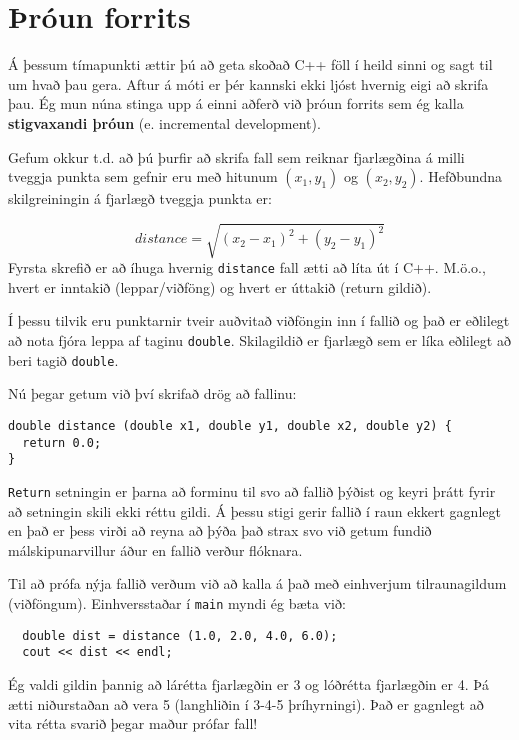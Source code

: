 \section{Þróun forrits}
\label{distance}

Á þessum tímapunkti ættir þú að geta skoðað C++ föll í heild sinni og sagt til um hvað þau gera.
Aftur á móti er þér kannski ekki ljóst hvernig eigi að skrifa þau.
Ég mun núna stinga upp á einni aðferð við þróun forrits sem ég kalla {\bf stigvaxandi þróun} (e. incremental development).


Gefum okkur t.d. að þú þurfir að skrifa fall sem reiknar fjarlægðina á milli tveggja punkta sem gefnir eru með hitunum $(x_1, y_1)$ og $(x_2, y_2)$.
Hefðbundna skilgreiningin á fjarlægð tveggja punkta er:

\begin{equation}
distance = \sqrt{(x_2 - x_1)^2 + (y_2 - y_1)^2}
\end{equation}
%
Fyrsta skrefið er að íhuga hvernig {\tt distance} fall ætti að líta út í C++.
M.ö.o., hvert er inntakið (leppar/viðföng) og hvert er úttakið (return gildið).

Í þessu tilvik eru punktarnir tveir auðvitað viðföngin inn í fallið og það er eðlilegt að nota fjóra leppa af taginu {\tt double}.
Skilagildið er fjarlægð sem er líka eðlilegt að beri tagið {\tt double}.

Nú þegar getum við því skrifað drög að fallinu:

\begin{verbatim}
double distance (double x1, double y1, double x2, double y2) {
  return 0.0;
}
\end{verbatim}
%
{\tt Return} setningin er þarna að forminu til svo að fallið þýðist og keyri þrátt fyrir að setningin skili ekki réttu gildi.
Á þessu stigi gerir fallið í raun ekkert gagnlegt en það er þess virði að reyna að þýða það strax svo við getum fundið málskipunarvillur áður en fallið verður flóknara.

Til að prófa nýja fallið verðum við að kalla á það með einhverjum tilraunagildum (viðföngum).
Einhversstaðar í {\tt main} myndi ég bæta við:

\begin{verbatim}
  double dist = distance (1.0, 2.0, 4.0, 6.0);
  cout << dist << endl;
\end{verbatim}
%
Ég valdi gildin þannig að lárétta fjarlægðin er 3 og lóðrétta fjarlægðin er 4.
Þá ætti niðurstaðan að vera 5 (langhliðin í 3-4-5 þríhyrningi).
Það er gagnlegt að vita rétta svarið þegar maður prófar fall!

